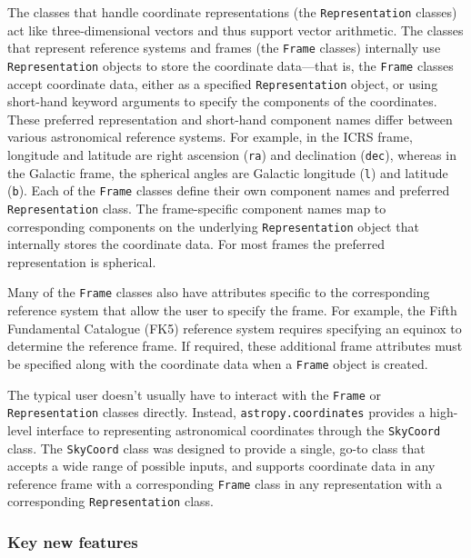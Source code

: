 \documentclass[modern]{aastex61}
\begin{document}
The classes that handle coordinate representations (the \texttt{Representation}
classes) act like three-dimensional vectors and thus support vector arithmetic.
The classes that represent reference systems and frames (the \texttt{Frame}
classes) internally use \texttt{Representation} objects to store the coordinate
data---that is, the \texttt{Frame} classes accept coordinate data, either as a
specified \texttt{Representation} object, or using short-hand keyword arguments
to specify the components of the coordinates.
These preferred representation and short-hand component names differ between
various astronomical reference systems.
For example, in the ICRS frame, longitude and latitude are right ascension
(\texttt{ra}) and declination (\texttt{dec}), whereas in the Galactic frame, the
spherical angles are Galactic longitude (\texttt{l}) and latitude (\texttt{b}).
Each of the \texttt{Frame} classes define their own component names and
preferred \texttt{Representation} class.
The frame-specific component names map to corresponding components on the
underlying \texttt{Representation} object that internally stores the coordinate
data.
For most frames the preferred representation is spherical.

Many of the \texttt{Frame} classes also have attributes specific to the
corresponding reference system that allow the user to specify the frame.
For example, the Fifth Fundamental Catalogue (FK5) reference system requires
specifying an equinox to determine the reference frame.
If required, these additional frame attributes must be specified along with the
coordinate data when a \texttt{Frame} object is created.

The typical user doesn't usually have to interact with the \texttt{Frame} or
\texttt{Representation} classes directly.
Instead, \texttt{astropy.coordinates} provides a high-level interface to
representing astronomical coordinates through the \texttt{SkyCoord} class.
The \texttt{SkyCoord} class was designed to provide a single, go-to class that
accepts a wide range of possible inputs, and supports coordinate data in any
reference frame with a corresponding \texttt{Frame} class in any representation
with a corresponding \texttt{Representation} class.

\subsubsection{Key new features}
\end{document}
